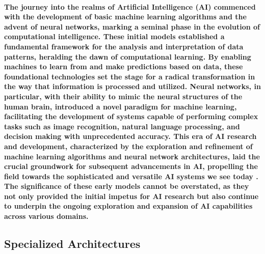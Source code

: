 \documentclass[11pt,a4paper,oneside]{report}
\begin{document}
\paragraph{The journey into the realms of Artificial Intelligence (AI) commenced with the development of basic machine learning algorithms and the advent of neural networks, marking a seminal phase in the evolution of computational intelligence. These initial models established a fundamental framework for the analysis and interpretation of data patterns, heralding the dawn of computational learning. By enabling machines to learn from and make predictions based on data, these foundational technologies set the stage for a radical transformation in the way that information is processed and utilized. Neural networks, in particular, with their ability to mimic the neural structures of the human brain, introduced a novel paradigm for machine learning, facilitating the development of systems capable of performing complex tasks such as image recognition, natural language processing, and decision making with unprecedented accuracy. This era of AI research and development, characterized by the exploration and refinement of machine learning algorithms and neural network architectures, laid the crucial groundwork for subsequent advancements in AI, propelling the field towards the sophisticated and versatile AI systems we see today \cite{huang2022large}. The significance of these early models cannot be overstated, as they not only provided the initial impetus for AI research but also continue to underpin the ongoing exploration and expansion of AI capabilities across various domains.}

\subsection{Specialized Architectures}
\end{document}
